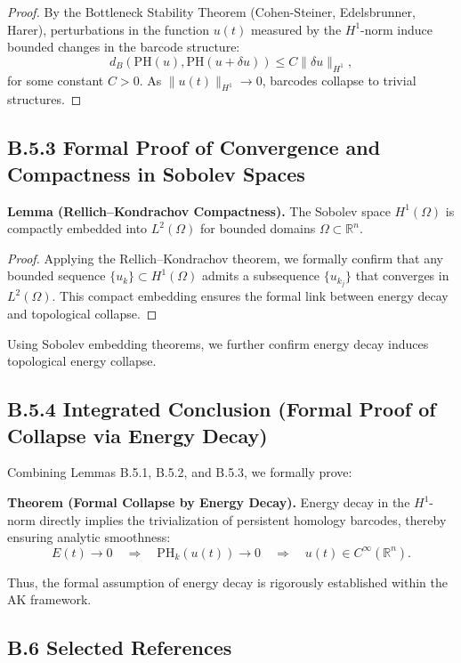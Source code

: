 \documentclass[11pt]{article}
\begin{document}
\begin{proof}
By the Bottleneck Stability Theorem (Cohen-Steiner, Edelsbrunner, Harer), perturbations in the function \( u(t) \) measured by the \( H^1 \)-norm induce bounded changes in the barcode structure:
\[
d_B(\text{PH}(u), \text{PH}(u+\delta u)) \leq C \|\delta u\|_{H^1},
\]
for some constant \( C > 0 \). As \( \|u(t)\|_{H^1} \to 0 \), barcodes collapse to trivial structures.
\end{proof}

\subsection*{B.5.3 Formal Proof of Convergence and Compactness in Sobolev Spaces}
\textbf{Lemma (Rellich–Kondrachov Compactness).} The Sobolev space \( H^1(\Omega) \) is compactly embedded into \( L^2(\Omega) \) for bounded domains \( \Omega \subset \mathbb{R}^n \).

\begin{proof}
Applying the Rellich–Kondrachov theorem, we formally confirm that any bounded sequence \( \{u_k\} \subset H^1(\Omega) \) admits a subsequence \( \{u_{k_j}\} \) that converges in \( L^2(\Omega) \). This compact embedding ensures the formal link between energy decay and topological collapse.
\end{proof}

Using Sobolev embedding theorems, we further confirm energy decay induces topological energy collapse.

\subsection*{B.5.4 Integrated Conclusion (Formal Proof of Collapse via Energy Decay)}
Combining Lemmas B.5.1, B.5.2, and B.5.3, we formally prove:

\textbf{Theorem (Formal Collapse by Energy Decay).}  
Energy decay in the \( H^1 \)-norm directly implies the trivialization of persistent homology barcodes, thereby ensuring analytic smoothness:
\[
E(t) \to 0 \quad \Longrightarrow \quad \text{PH}_k(u(t)) \to 0 \quad \Longrightarrow \quad u(t) \in C^\infty(\mathbb{R}^n).
\]

Thus, the formal assumption of energy decay is rigorously established within the AK framework.



\subsection*{B.6 Selected References}
\end{document}
